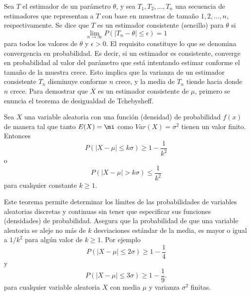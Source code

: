 \begin{def.}
    Sea $T$ el estimador de un parámetro $\theta$, y sea $T_1,T_2,\ldots,T_n$ una secuencia de estimadores que representan a $T$ con base en muestras de tamaño $1,2,\ldots, n$, respectivamente. Se dice que $T$ es un estimador consistente (sencillo) para $\theta$ si
    $$\lim_{n\to \infty}P(|T_n-\theta|\leq \epsilon)=1$$
    para todos los valores de $\theta$ y $\epsilon>0$.
    El requisito constituye lo que se denomina convergencia en probabilidad. Es decir, si un estimador es consistente, converge en probabilidad al valor del parámetro que está intentando estimar conforme el tamaño de la muestra crece. Esto implica que la varianza de un estimador consistente $T_n$ disminuye conforme $n$ crece, y la media de $T_n$ tiende hacia donde $n$ crece. Para demostrar que $\overline{X}$ es un estimador consistente de $\mu$, primero se enuncia el teorema de desigualdad de Tchebysheff.
\end{def.}

\begin{teo}
    Sea $X$ una variable aleatoria con una función (densidad) de probabilidad $f(x)$ de manera tal que tanto $E(X)=\mi$ como $Var(X)=\sigma^2$ tienen un valor finito. Entonces
    $$P(|X-\mu|\leq k\sigma)\geq 1-\dfrac{1}{k^2}$$
    o
    $$P(|X-\mu|>k\sigma)\leq \dfrac{1}{k^2}$$
    para cualquier constante $k\geq 1$.
\end{teo}

Este teorema permite determinar los límites de las probabilidades de variables aleatorias discretas y continuas sin tener que especificar sus funciones (densidades) de probabilidad. Asegura que la probabilidad de que una variable aleatoria se aleje no más de $k$ desviaciones estándar de la media, es mayor o igual a $1/k^2$ para algún valor de $k\geq 1$. Por ejemplo
$$P(|X-\mu|\leq 2\sigma)\geq 1-\dfrac{1}{4}$$
y
$$P(|X-\mu|\leq 3\sigma)\geq 1-\dfrac{1}{9}.$$
para cualquier variable aleatoria $X$ con media $\mu$ y varianza $\sigma^2$ finitas.

